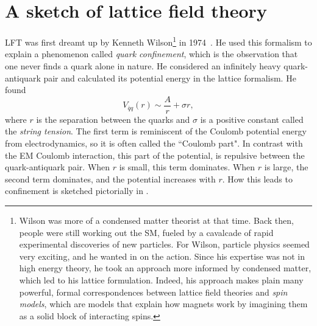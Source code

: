 \chapter{A sketch of lattice field theory}\label{ch:LFT}

LFT was first dreamt up by Kenneth Wilson\footnote{Wilson was more of a condensed
matter theorist at that time. Back then, people were still working out the SM,
fueled by a cavalcade of rapid experimental discoveries of new particles. For
Wilson, particle physics seemed very exciting, and he wanted in on the action.
Since his expertise was not in high energy theory, he took an approach more
informed by condensed matter, which led to his lattice formulation. Indeed, his
approach makes plain many powerful, formal correspondences between lattice field
theories and {\it spin models}, which are models that explain
how magnets work by imagining them as a solid block of interacting spins.} 
in 1974~\cite{wilson_confinement_1974}.
He used this formalism to explain a phenomenon called {\it quark
confinement}, which is the observation that one never
finds a quark alone in nature. He considered an infinitely heavy quark-antiquark
pair and calculated its potential energy in the lattice formalism. He found
\begin{equation}
V_{\bar{q}q}(r)\sim\frac{A}{r}+\sigma r,
\end{equation}
where $r$ is the separation between the quarks and $\sigma$ is a positive 
constant called the {\it string tension}. The first term 
is reminiscent of the Coulomb potential energy from electrodynamics, so it is 
often called the ``Coulomb part". In contrast with the EM Coulomb interaction, 
this part of the potential, is repulsive between the quark-antiquark pair.
When $r$ is small, this term dominates. When $r$ is large, the second term
dominates, and the potential increases with $r$.
How this leads to confinement is sketched pictorially
in . 

